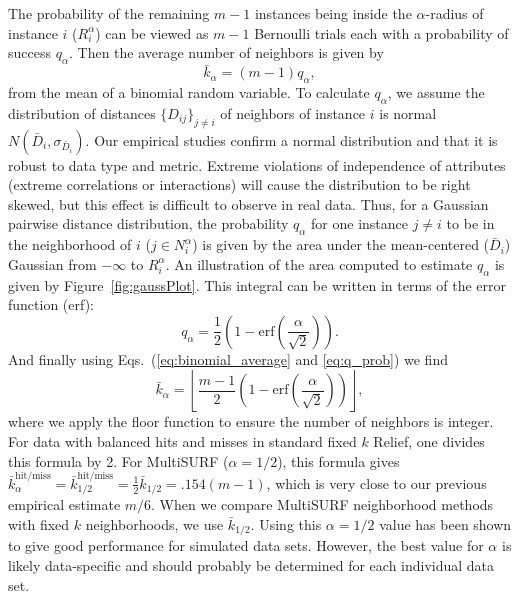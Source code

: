 \documentclass[10pt,letterpaper]{article}
\begin{document}
The probability of the remaining $m-1$ instances being inside the $\alpha$-radius of instance $i$ ($R_i^{\alpha}$) can be viewed as $m-1$ Bernoulli trials each with a probability of success $q_{\alpha}$. Then the average number of neighbors is given by
\begin{equation}
\label{eq:binomial_average}
  {\bar{k}}_{\alpha} = (m-1)q_{\alpha},
\end{equation}
from the mean of a binomial random variable. To calculate $q_{\alpha}$, we assume the distribution of distances $\{D_{ij} \}_{j \ne i}$ of neighbors of instance $i$ is normal $N(\bar{D}_i,\sigma_{\bar{D}_i})$. Our empirical studies confirm a normal distribution and that it is robust to data type and metric. Extreme violations of independence of attributes (extreme correlations or interactions) will cause the distribution to be right skewed, but this effect is difficult to observe in real data. Thus, for a Gaussian pairwise distance distribution, the probability $q_{\alpha}$ for one instance $j \ne i$ to be in the neighborhood of $i$ ($j \in N^{\alpha}_{i}$) is given by the area under the mean-centered ($\bar{D}_i$) Gaussian from $-\infty$ to $R_i^{\alpha}$. An illustration of the area computed to estimate $q_{\alpha}$ is given by Figure~\ref{fig:gaussPlot}. This integral can be written in terms of the error function (erf):
\begin{equation}
\label{eq:q_prob}
q_{\alpha} = \frac{1}{2} \left( 1 - \mathrm{erf}\left( \frac{\alpha}{\sqrt{2}} \right) \right).
\end{equation}
And finally using Eqs.~(\ref{eq:binomial_average} and \ref{eq:q_prob}) we find
\begin{equation}\label{eq:kbar}
{\bar{k}}_{\alpha} = \left \lfloor \frac{m-1}{2}  \left( 1 - \mathrm{erf}\left( \frac{\alpha}{\sqrt{2}} \right) \right) \right \rfloor,
\end{equation}
where we apply the floor function to ensure the number of neighbors is integer. For data with balanced hits and misses in standard fixed $k$ Relief, one divides this formula by 2. For MultiSURF ($\alpha=1/2$), this formula gives $\bar{k}_{\alpha}^{\text{hit/miss}} = \bar{k}_{1/2}^{\text{hit/miss}} = \frac{1}{2}\bar{k}_{1/2} = .154 (m-1)$, which is very close to our previous empirical estimate $m/6$. When we compare MultiSURF neighborhood methods with fixed $k$ neighborhoods, we use $\bar{k}_{1/2}$. Using this $\alpha=1/2$ value has been shown to give good performance for simulated data sets. However, the best value for $\alpha$ is likely data-specific and should probably be determined for each individual data set.
\end{document}
